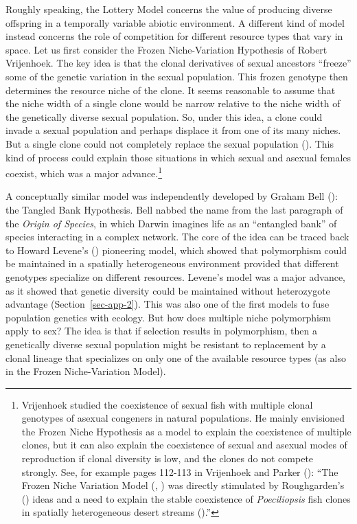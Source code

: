 \documentclass[
  american,
  letterpaper,
]{book}
\begin{document}
Roughly speaking, the Lottery Model concerns the value of producing
diverse offspring in a temporally variable abiotic environment. A
different kind of model instead concerns the role of competition for
different resource types that vary in space. Let us first consider the
Frozen Niche-Variation Hypothesis of Robert Vrijenhoek. The key idea is
that the clonal derivatives of sexual ancestors ``freeze'' some of the
genetic variation in the sexual population. This frozen genotype then
determines the resource niche of the clone. It seems reasonable to
assume that the niche width of a single clone would be narrow relative
to the niche width of the genetically diverse sexual population. So,
under this idea, a clone could invade a sexual population and perhaps
displace it from one of its many niches. But a single clone could not
completely replace the sexual population
(). This kind of process
could explain those situations in which sexual and asexual females
coexist, which was a major advance.\footnote{Vrijenhoek studied the
  coexistence of sexual fish with multiple clonal genotypes of asexual
  congeners in natural populations. He mainly envisioned the Frozen
  Niche Hypothesis as a model to explain the coexistence of multiple
  clones, but it can also explain the coexistence of sexual and asexual
  modes of reproduction if clonal diversity is low, and the clones do
  not compete strongly. See, for example pages 112-113 in Vrijenhoek and
  Parker (): ``The Frozen Niche
  Variation Model (,
  ) was directly stimulated by
  Roughgarden's () ideas and a need
  to explain the stable coexistence of \emph{Poeciliopsis} fish clones
  in spatially heterogeneous desert streams
  ().''}

A conceptually similar model was independently developed by Graham Bell
(): the Tangled Bank Hypothesis. Bell
nabbed the name from the last paragraph of the \emph{Origin of Species},
in which Darwin imagines life as an ``entangled bank'' of species
interacting in a complex network. The core of the idea can be traced
back to Howard Levene's () pioneering
model, which showed that polymorphism could be maintained in a spatially
heterogeneous environment provided that different genotypes specialize
on different resources. Levene's model was a major advance, as it showed
that genetic diversity could be maintained without heterozygote
advantage (Section~\ref{sec-app-2}). This was also one of the first
models to fuse population genetics with ecology. But how does multiple
niche polymorphism apply to sex? The idea is that if selection results
in polymorphism, then a genetically diverse sexual population might be
resistant to replacement by a clonal lineage that specializes on only
one of the available resource types (as also in the Frozen
Niche-Variation Model).
\end{document}
